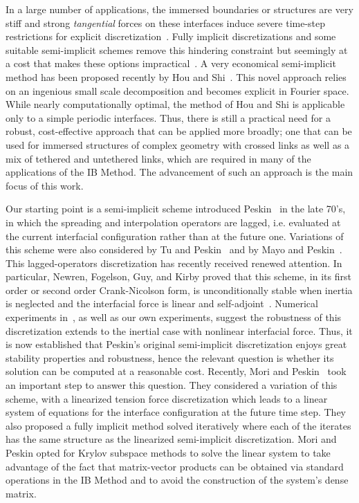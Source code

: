 \documentclass[preprint,12pt]{elsarticle}
\begin{document}
In a large number of applications, the immersed boundaries or structures are very stiff and strong {\em tangential}
forces on these interfaces induce severe time-step restrictions for explicit discretization~\cite{SW95,SW99}. Fully implicit discretizations and some suitable semi-implicit schemes remove this hindering constraint but seemingly at a cost that makes these options impractical~\cite{TP92, MP93}.  A very economical semi-implicit method has been proposed recently by Hou and Shi~\cite{HS2008a,HS2008b}. This novel approach relies on an ingenious  small scale decomposition and becomes explicit in Fourier space. While nearly computationally optimal, the method of Hou and Shi is applicable only to a simple periodic interfaces. 
Thus, there is still a practical need for a robust, cost-effective approach that can be applied more broadly; one that can be used
for immersed structures of complex geometry with crossed links as well as a mix of tethered and untethered links,  which are required in many of the applications of the IB Method.  The advancement of such an approach is the main focus of this work.

Our starting point is a semi-implicit scheme introduced Peskin~\cite{Peskin77} in the late 70's, in which
the spreading and interpolation operators are lagged, i.e. evaluated at the current interfacial configuration rather than at the future one.  Variations of this scheme were also considered by Tu and Peskin~\cite{TP92} and by Mayo and Peskin~\cite{MP93}. This lagged-operators discretization has recently received renewed attention.  In particular, Newren, Fogelson, Guy, and Kirby
proved that this scheme, in its first order or second order Crank-Nicolson form, is unconditionally stable when inertia is neglected and the interfacial  force is linear and self-adjoint~\cite{NFGK2007}. Numerical experiments in~\cite{NFGK2007}, as well as our own experiments, suggest the robustness of this discretization extends to the inertial case with nonlinear interfacial force.
 Thus, it is now established that 
Peskin's original semi-implicit discretization enjoys great stability properties and robustness, 
hence the relevant question is whether its solution  can be computed at a reasonable cost. Recently, Mori and Peskin~\cite{MP2008}  took an important step to answer this question. 
They considered a variation of this scheme, with a linearized tension force discretization which leads to a linear system of equations for the interface configuration at the future time step. They also proposed a fully implicit method solved iteratively where each of the iterates has the same structure as the linearized semi-implicit discretization.  Mori and Peskin opted for Krylov subspace methods to solve the linear system to take advantage of the  fact that matrix-vector products can be obtained via standard operations in the IB Method and to avoid the construction of the system's dense matrix. 
\end{document}
